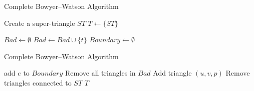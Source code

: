 \documentclass[aspectratio=169]{beamer}
\begin{document}
\begin{frame}{Complete Bowyer--Watson Algorithm}
\begin{algorithm}[H]
\scriptsize
\caption{Bowyer--Watson}
\begin{algorithmic}[1]

\State Create a super-triangle $ST$
\State $T \gets \{ST\}$

    \State $Bad \gets \emptyset$
            \State $Bad \gets Bad \cup \{t\}$
        \EndIf
    \EndFor
    \EndFor
    \State $Boundary \gets \emptyset$
\end{algorithmic}
\end{algorithm}
\end{frame}
\begin{frame}{Complete Bowyer--Watson Algorithm}
\begin{algorithm}[H]
\scriptsize
\caption{Bowyer--Watson}
\begin{algorithmic}[1]
                \State add $e$ to $Boundary$
            \EndIf
        \EndFor
     \EndFor
    \State Remove all triangles in $Bad$
        \State Add triangle $(u,v,p)$
    \EndFor
\State Remove triangles connected to $ST$
\State \Return $T$
\end{algorithmic}
\end{algorithm}
\end{frame}
\end{document}
